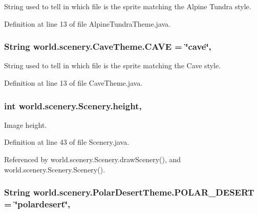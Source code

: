 String used to tell in which file is the sprite matching the Alpine Tundra style. 



Definition at line 13 of file Alpine\-Tundra\-Theme.\-java.

\hypertarget{a00004_abbad3655c1d1f230dddfd7ecc5194f50}{
\subsubsection[{C\-A\-V\-E}]{\setlength{\rightskip}{0pt plus 5cm}String world.\-scenery.\-Cave\-Theme.\-C\-A\-V\-E = \char`\"{}cave\char`\"{}\hspace{0.3cm}{\ttfamily [static]}, {\ttfamily [inherited]}}}\label{a00004_abbad3655c1d1f230dddfd7ecc5194f50}


String used to tell in which file is the sprite matching the Cave style. 



Definition at line 13 of file Cave\-Theme.\-java.

\hypertarget{a00024_a54b4edfa060087e78a829105bf62a900}{
\subsubsection[{height}]{\setlength{\rightskip}{0pt plus 5cm}int world.\-scenery.\-Scenery.\-height\hspace{0.3cm}{\ttfamily [protected]}, {\ttfamily [inherited]}}}\label{a00024_a54b4edfa060087e78a829105bf62a900}


Image height. 



Definition at line 43 of file Scenery.\-java.



Referenced by world.\-scenery.\-Scenery.\-draw\-Scenery(), and world.\-scenery.\-Scenery.\-Scenery().

\hypertarget{a00019_a48dd1801e0146ea2306dadcbdee81b77}{
\subsubsection[{P\-O\-L\-A\-R\-\_\-\-D\-E\-S\-E\-R\-T}]{\setlength{\rightskip}{0pt plus 5cm}String world.\-scenery.\-Polar\-Desert\-Theme.\-P\-O\-L\-A\-R\-\_\-\-D\-E\-S\-E\-R\-T = \char`\"{}polardesert\char`\"{}\hspace{0.3cm}{\ttfamily [static]}, {\ttfamily [inherited]}}}\label{a00019_a48dd1801e0146ea2306dadcbdee81b77}


